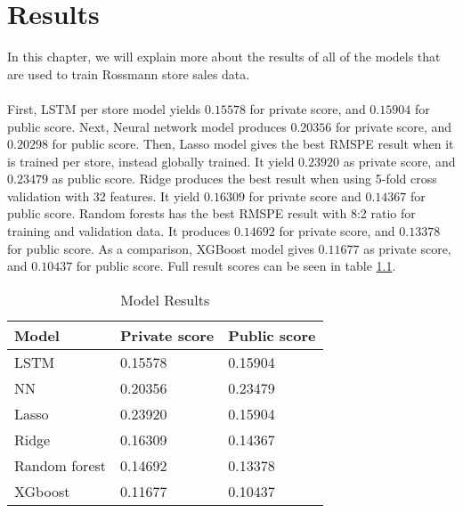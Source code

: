 \chapter{Results}
In this chapter, we will explain more about the results of all of the models that are used to train Rossmann store sales data. \\ \\
First, LSTM per store model yields $0.15578$ for private score, and $0.15904$ for public score. Next, Neural network model produces $0.20356$ for private score, and $0.20298$ for public score. Then, Lasso model gives the best RMSPE result when it is trained per store, instead globally trained. It yield $0.23920$ as private score, and $0.23479$ as public score. Ridge produces the best result when using 5-fold cross validation with 32 features. It yield $0.16309$ for private score and $0.14367$ for public score. Random forests has the best RMSPE result with 8:2 ratio for training and validation data. It produces $0.14692$ for private score, and $0.13378$ for public score. As a comparison, XGBoost model gives $0.11677$ as private score, and $0.10437$ for public score. Full result scores can be seen in table \ref{tab:result}.

\begin{table}[H]
	\centering
	\caption{Model Results}
	\label{tab:result}
	\begin{tabular}{|m{}|m{}|m{}|}
		\hline
		Model & Private score & Public score \\ \hline
		LSTM & 0.15578 & 0.15904 \\ \hline
		NN & 0.20356 & 0.23479 \\ \hline
		Lasso & 0.23920 & 0.15904 \\ \hline
		Ridge & 0.16309 & 0.14367 \\ \hline
		Random forest & 0.14692 & 0.13378 \\ \hline
		XGboost & 0.11677 & 0.10437 \\ \hline
	\end{tabular}
\end{table}
